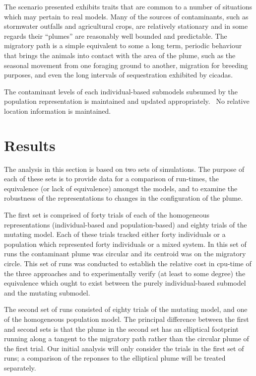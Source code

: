 \documentclass{article}
\begin{document}
The scenario presented exhibits traits that are common to a number of
situations which may pertain to real models. Many of the sources of
contaminants, such as stormwater outfalls and agricultural crops, are
relatively stationary and in some regards their ``plumes'' are reasonably well
bounded and predictable. The migratory path is a simple equivalent to some a
long term, periodic behaviour that brings the animals into contact with the
area of the plume, such as the seasonal movement from one foraging ground to
another, migration for breeding purposes, and even the long intervals of
sequestration exhibited by cicadas.

The contaminant levels of each individual-based submodels subsumed by the
population representation is maintained and updated appropriately. \ No
relative location information is maintained.

\section{Results}

The analysis in this section is based on two sets of simulations. The purpose
of each of these sets is to provide data for a comparison of run-times, the
equivalence (or lack of equivalence) amongst the models, and to examine the
robustness of the representations to changes in the configuration of the
plume.

The first set is comprised of forty trials of each of the homogeneous
representations (individual-based and population-based) and eighty trials of
the mutating model. Each of these trials tracked either forty individuals or a
population which represented forty individuals or a mixed system. In this set
of runs the contaminant plume was circular and its centroid was on the
migratory circle. This set of runs was conducted to establish the relative
cost in cpu-time of the three approaches and to experimentally verify (at
least to some degree) the equivalence which ought to exist between the purely
individual-based submodel and the mutating submodel.

The second set of runs consisted of eighty trials of the mutating model, and
one of the homogeneous population model. The principal difference between the
first and second sets is that the plume in the second set has an elliptical
footprint running along a tangent to the migratory path rather than the
circular plume of the first trial. Our initial analysis will only consider the
trials in the first set of runs; a comparison of the reponses to the
elliptical plume will be treated separately.
\end{document}
